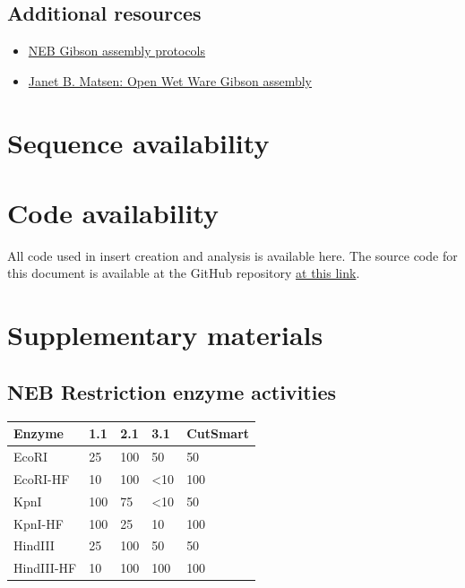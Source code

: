 \documentclass[11pt]{article}
\begin{document}
\subsection{Additional resources}

\begin{itemize}
	\item \href{https://www.neb.com/applications/cloning-and-synthetic-biology/dna-assembly-and-cloning/gibson-assembly}{NEB Gibson assembly protocols}
	\item \href{https://openwetware.org/wiki/Janet_B._Matsen:Guide_to_Gibson_Assembly}{Janet B. Matsen: Open Wet Ware Gibson assembly}
\end{itemize}

\section{Sequence availability}




\section{Code availability}

All code used in insert creation and analysis is available here. The source code for this document is available at the GitHub repository \href{https://github.com/EthanHolleman/plasmid-VR-design}{at this link}.

\section{Supplementary materials}

\subsection{NEB Restriction enzyme activities}

\begin{table}[H]
	\centering
	\begin{tabular}{@{}lllll@{}}
		\toprule
		Enzyme     & 1.1 & 2.1 & 3.1           & CutSmart \\ \midrule
		EcoRI      & 25  & 100 & 50            & 50       \\
		EcoRI-HF   & 10  & 100 & \textless{}10 & 100      \\
		KpnI       & 100 & 75  & \textless{}10 & 50       \\
		KpnI-HF    & 100 & 25  & 10            & 100      \\
		HindIII    & 25  & 100 & 50            & 50       \\
		HindIII-HF & 10  & 100 & 100           & 100      \\ \bottomrule
	\end{tabular}
\end{table}
\end{document}
